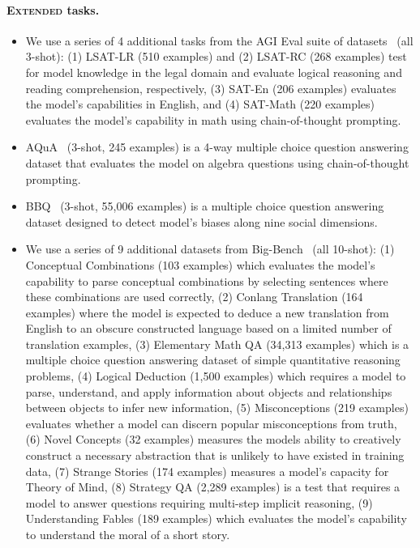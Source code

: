 \documentclass{article}
\newcommand{\aggscore}{\textsc{Extended}\xspace}
\begin{document}
\paragraph{\aggscore tasks.}

\begin{itemize}
    \item
    We use a series of 4 additional tasks from the AGI Eval suite of datasets~\citep{zhong2023agieval} (all 3-shot): (1) LSAT-LR (510 examples) and (2) LSAT-RC (268 examples) test for model knowledge in the legal domain and evaluate logical reasoning and reading comprehension, respectively, (3) SAT-En (206 examples) evaluates the model's capabilities in English, and (4) SAT-Math (220 examples) evaluates the model's capability in math using chain-of-thought prompting.
    \item
    AQuA~\citep{ling2017program} (3-shot, 245 examples) is a 4-way multiple choice question answering dataset that evaluates the model on algebra questions using chain-of-thought prompting.
    \item
    BBQ~\citep{bbq} (3-shot, 55,006 examples) is a multiple choice question answering dataset designed to detect model's biases along nine social dimensions.
    \item
    We use a series of 9 additional datasets from Big-Bench~\citep{srivastava2023beyond} (all 10-shot): (1) Conceptual Combinations (103 examples) which evaluates the model's capability to parse conceptual combinations by selecting sentences where these combinations are used correctly, (2) Conlang Translation (164 examples) where the model is expected to deduce a new translation from English to an obscure constructed language based on a limited number of translation examples, (3) Elementary Math QA (34,313 examples) which is a multiple choice question answering dataset of simple quantitative reasoning problems, (4) Logical Deduction (1,500 examples) which requires a model to parse, understand, and apply information about objects and relationships between objects to infer new information, (5) Misconceptions (219 examples) evaluates whether a model can discern popular misconceptions from truth, (6) Novel Concepts (32 examples) measures the models ability to creatively construct a necessary abstraction that is unlikely to have existed in training data, (7) Strange Stories (174 examples) measures a model's capacity for Theory of Mind, (8) Strategy QA (2,289 examples) is a test that requires a model to answer questions requiring multi-step implicit reasoning, (9) Understanding Fables (189 examples) which evaluates the model's capability to understand the moral of a short story.

\end{itemize}
\end{document}
